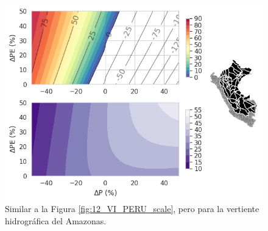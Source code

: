 \begin{figure}[ht!]
	\includegraphics[scale=.85]{Images/12_VI_Nivel_scale_Amazon.png}
	\centering
	\caption{Similar a la Figura \ref{fig:12_VI_PERU_scale}, pero para la vertiente hidrográfica del Amazonas.}
	\label{fig:12_VI_Nivel_scale_Amazon}
\end{figure}
